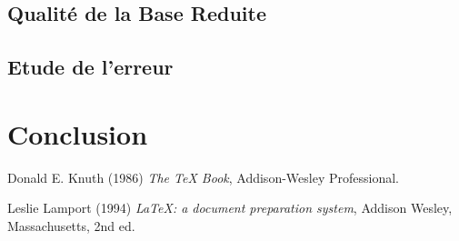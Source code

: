 \documentclass[12pt]{article}
\begin{document}
\subsection{Qualité de la Base Reduite}

\subsection{Etude de l'erreur }


\section{Conclusion}


\begin{thebibliography}{9}


Donald E. Knuth (1986) \emph{The \TeX{} Book}, Addison-Wesley Professional.

Leslie Lamport (1994) \emph{\LaTeX: a document preparation system}, Addison
Wesley, Massachusetts, 2nd ed.


\end{thebibliography}
\end{document}
